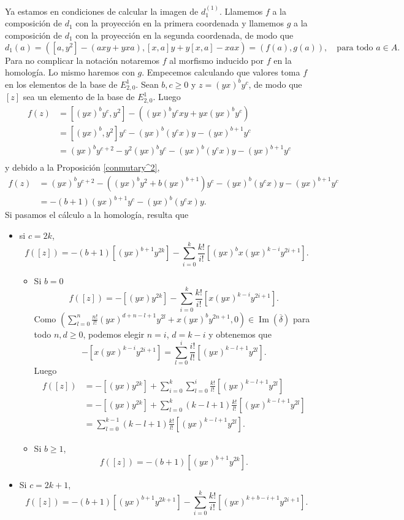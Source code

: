 \documentclass[a4paper,oneside,fleqn,11pt]{article}
\numberwithin{prop}{subsection}
\DeclareMathOperator\Ima{Im}
\begin{document}
Ya estamos en condiciones de calcular la imagen de $d_1^{(1)}$. Llamemos
$f$ a la composición de $d_1$ con la proyección en la primera coordenada y llamemos $g$ a la composición de $d_1$ con la proyección en la segunda coordenada, de modo que
\[
	d_1(a) =  \left(\left[a,y^2\right] - (axy + yxa), \left[x,a\right]y + y\left[x,a\right] - xax\right) = (f(a), g(a)), \quad\text{para todo } a \in A.
\]
Para no complicar la notación notaremos $f$ al morfismo inducido por $f$ en la homología. Lo mismo haremos con $g$.
Empecemos calculando que valores toma $f$ en los elementos de la base de $E^1_{2, 0}$. Sean $b, c \geq 0$ y $z = (yx)^by^c$, de modo que $\left[z\right]$
sea un elemento de la base de $E^1_{2, 0}$. Luego
\begin{align*}
	f(z) &= \left[(yx)^by^c, y^2\right] - \left((yx)^by^cxy + yx(yx)^by^c\right)\\
	&= \left[(yx)^b, y^2\right]y^c - (yx)^b(y^cx)y - (yx)^{b + 1}y^c \\
	&= (yx)^by^{c + 2} - y^2(yx)^by^c - (yx)^b(y^cx)y - (yx)^{b + 1}y^c \\
\end{align*}
y debido a la Proposición \ref{conmutary^2},
\begin{align*}
	f(z) &= (yx)^by^{c + 2} - ((yx)^by^2 + b(yx)^{b + 1})y^c - (yx)^b(y^cx)y - (yx)^{b + 1}y^c \\
	&= - (b + 1)(yx)^{b + 1}y^c - (yx)^b(y^cx)y.
\end{align*}
Si pasamos el cálculo a la homología, resulta que
\begin{itemize}
	\item si $c = 2k$,
	\[
		f([z]) = -(b + 1)\left[(yx)^{b + 1}y^{2k}\right] - \sum_{i  = 0}^k\frac{k!}{i!}\left[(yx)^bx(yx)^{k - i}y^{2i + 1}\right].
	\]	
	
	\begin{itemize}
		\item Si $b = 0$
		\[
			f([z]) = -\left[(yx)y^{2k}\right] - \sum_{i  = 0}^k\frac{k!}{i!}\left[x(yx)^{k - i}y^{2i + 1}\right].
		\]
		Como $\left(\sum_{l = 0}^n\frac{n!}{l!}(yx)^{d + n - l + 1}y^{2l} + x(yx)^by^{2n + 1}, 0\right) \in \Ima(\overline{\delta})$
		para todo $n,d \geq 0$, podemos elegir $n = i$, $d = k - i$ y obtenemos que 
		\[
			-\left[x(yx)^{k - i}y^{2i + 1}\right] = \sum_{l = 0}^i\frac{i!}{l!}\left[(yx)^{k - l + 1}y^{2l}\right].
		\]
		Luego
		\begin{align*}
			f([z]) &= -\left[(yx)y^{2k}\right] + \sum_{i  = 0}^k\sum_{l = 0}^i\frac{k!}{l!}\left[(yx)^{k - l + 1}y^{2l}\right]\\
			&= -\left[(yx)y^{2k}\right] + \sum_{l = 0}^{k}(k - l + 1)\frac{k!}{l!}\left[(yx)^{k - l + 1}y^{2l}\right]\\
			&= \sum_{l = 0}^{k - 1}(k - l + 1)\frac{k!}{l!}\left[(yx)^{k - l + 1}y^{2l}\right].
		\end{align*}
		\item Si $b \geq 1$,
		\[		
		f([z]) = -(b + 1)\left[(yx)^{b + 1}y^{2k}\right].
		\]	
	\end{itemize}
	\item Si $c = 2k + 1$,
	\[
		f([z]) = -(b + 1)\left[(yx)^{b + 1}y^{2k + 1}\right] - \sum_{i  = 0}^k\frac{k!}{i!}\left[(yx)^{k + b - i + 1}y^{2i + 1}\right].
	\]
\end{itemize}
\end{document}
